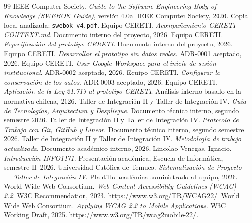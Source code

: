 \documentclass[10pt,a4paper,oneside]{article}
\begin{document}
\begin{center}
\end{center}

\small
\begin{thebibliography}{99}
\setlength{\itemsep}{0pt}
 IEEE Computer Society. \textit{Guide to the Software Engineering Body of Knowledge (SWEBOK Guide)}, versión 4.0a. IEEE Computer Society, 2026. Copia local analizada: \texttt{swebok-v4.pdf}.
 Equipo CERETI. \textit{Acompañamiento CERETI --- CONTEXT.md}. Documento interno del proyecto, 2026.
 Equipo CERETI. \textit{Especificación del prototipo CERETI}. Documento interno del proyecto, 2026.
 Equipo CERETI. \textit{Desarrollar el prototipo sin datos reales}. ADR-0001 aceptado, 2026.
 Equipo CERETI. \textit{Usar Google Workspace para el inicio de sesión institucional}. ADR-0002 aceptado, 2026.
 Equipo CERETI. \textit{Configurar la conservación de los datos}. ADR-0003 aceptado, 2026.
 Equipo CERETI. \textit{Aplicación de la Ley 21.719 al prototipo CERETI}. Análisis interno basado en la normativa chilena, 2026.
 Taller de Integración II y Taller de Integración IV. \textit{Guía de Tecnologías, Arquitectura y Despliegue}. Documento técnico interno, segundo semestre 2026.
 Taller de Integración II y Taller de Integración IV. \textit{Protocolo de Trabajo con Git, GitHub y Linear}. Documento técnico interno, segundo semestre 2026.
 Taller de Integración II y Taller de Integración IV. \textit{Metodología de trabajo actualizada}. Documento académico interno, 2026.
 Lincolao Venegas, Ignacio. \textit{Introducción INFO1171}. Presentación académica, Escuela de Informática, semestre II--2026.
 Universidad Católica de Temuco. \textit{Sistematización de Proyecto --- Taller de Integración IV}. Plantilla académica suministrada al equipo, 2026.
 World Wide Web Consortium. \textit{Web Content Accessibility Guidelines (WCAG) 2.2}. W3C Recommendation, 2023. \url{https://www.w3.org/TR/WCAG22/}.
 World Wide Web Consortium. \textit{Applying WCAG 2.2 to Mobile Applications}. W3C Working Draft, 2025. \url{https://www.w3.org/TR/wcag2mobile-22/}.
\end{thebibliography}
\normalsize
\end{document}

